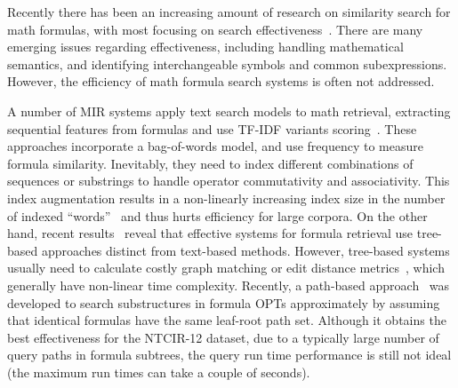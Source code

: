 \documentclass[runningheads]{llncs}
\begin{document}
Recently there has been an increasing amount of research on similarity search for math formulas, with most focusing on search effectiveness~\cite{a0_2019,tangent-combine2017,mcat_16,peking2016}.
There are many emerging issues regarding effectiveness, including handling mathematical semantics, and identifying interchangeable symbols and common subexpressions. However, the efficiency of math formula search systems is often not addressed.

%
A number of MIR systems apply text search models to math retrieval, extracting sequential features from formulas and use TF-IDF variants scoring~\cite{nist_03, mias_11, peking2014}. These approaches incorporate a bag-of-words model, and use frequency to measure formula similarity. Inevitably, they need to index different combinations of sequences or substrings to handle operator commutativity and associativity.
This index augmentation results in a non-linearly increasing index size in the number of indexed ``words''~\cite{peking2014} and thus hurts efficiency for large corpora.
%
On the other hand, recent results~\cite{ntcir12, a0_2019, tangent_2019} reveal that effective systems for formula retrieval use tree-based approaches distinct from text-based methods.
%
However, tree-based systems usually need to calculate costly graph matching or edit distance metrics~\cite{tangent-multistage2016, edit_dist2013}, which generally have non-linear time complexity.
Recently, a path-based approach~\cite{a0_2019} was developed to search substructures in formula OPTs approximately by assuming that identical formulas have the same leaf-root path set.
Although it obtains the best effectiveness for the NTCIR-12 dataset, due to a typically large number of query paths in formula subtrees, the query run time performance is still not ideal (the maximum run times can take a couple of seconds).
\end{document}
